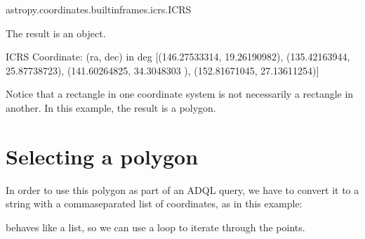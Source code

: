 \documentclass[letterpaper,10pt,english]{sphinxmanual}
\begin{document}
\begin{sphinxVerbatim}[commandchars=\\\{\}]
astropy.coordinates.builtin\PYGZus{}frames.icrs.ICRS
\end{sphinxVerbatim}

The result is an  object.

\begin{sphinxVerbatim}[commandchars=\\\{\}]
\end{sphinxVerbatim}

\begin{sphinxVerbatim}[commandchars=\\\{\}]
\PYGZlt{}ICRS Coordinate: (ra, dec) in deg
    [(146.27533314, 19.26190982), (135.42163944, 25.87738723),
     (141.60264825, 34.3048303 ), (152.81671045, 27.13611254)]\PYGZgt{}
\end{sphinxVerbatim}

Notice that a rectangle in one coordinate system is not necessarily a rectangle in another.  In this example, the result is a polygon.


\section{Selecting a polygon}
\label{\detokenize{02_coords:selecting-a-polygon}}
In order to use this polygon as part of an ADQL query, we have to convert it to a string with a comma\sphinxhyphen{}separated list of coordinates, as in this example:

\begin{sphinxVerbatim}[commandchars=\\\{\}]
\end{sphinxVerbatim}

 behaves like a list, so we can use a  loop to iterate through the points.

\begin{sphinxVerbatim}[commandchars=\\\{\}]
   
\end{sphinxVerbatim}
\end{document}

